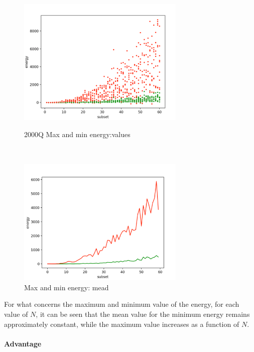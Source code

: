 \documentclass[oneside,a4paper]{article}
\begin{document}
\newpage
\begin{figure}[htp]
\begin{minipage}[b]{7.5cm}
\centering
\includegraphics[width=8cm]{LaTeXTemplate/Images/2000QMaxMinEnValue.png}
\caption{2000Q Max and min energy:values}
\end{minipage}
\ \hspace{2mm} \hspace{2mm} \
\begin{minipage}[b]{9cm}
\centering
\includegraphics[width=8cm]{LaTeXTemplate/Images/2000QMaxMinEnMean.png}
\caption{Max and min energy: mead}
\end{minipage}
\end{figure}
For what concerns the maximum and minimum value of the energy, for each value of $N$, it can be seen that the mean value for the minimum energy remains approximately constant, while the maximum value increases as a function of $N$. \\
\\
\textbf{Advantage}
\end{document}
